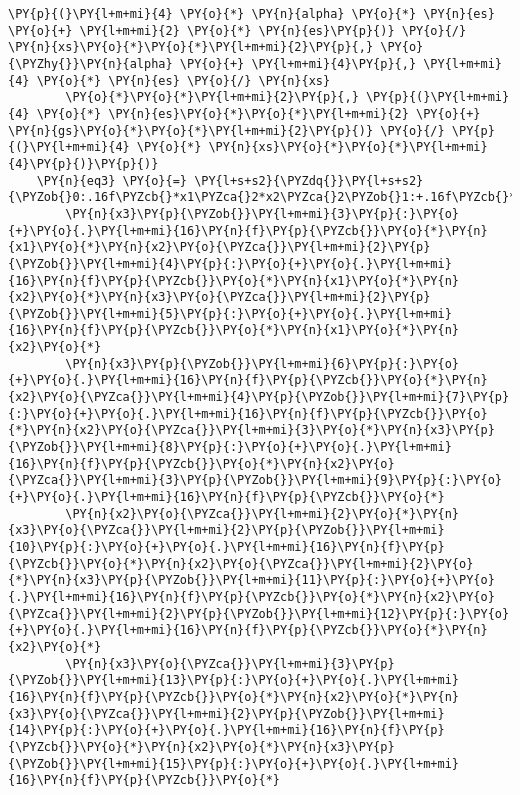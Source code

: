 \begin{Verbatim}[commandchars=\\\{\}]
        \PY{p}{(}\PY{l+m+mi}{4} \PY{o}{*} \PY{n}{alpha} \PY{o}{*} \PY{n}{es} \PY{o}{+} \PY{l+m+mi}{2} \PY{o}{*} \PY{n}{es}\PY{p}{)} \PY{o}{/} \PY{n}{xs}\PY{o}{*}\PY{o}{*}\PY{l+m+mi}{2}\PY{p}{,} \PY{o}{\PYZhy{}}\PY{n}{alpha} \PY{o}{+} \PY{l+m+mi}{4}\PY{p}{,} \PY{l+m+mi}{4} \PY{o}{*} \PY{n}{es} \PY{o}{/} \PY{n}{xs}
        \PY{o}{*}\PY{o}{*}\PY{l+m+mi}{2}\PY{p}{,} \PY{p}{(}\PY{l+m+mi}{4} \PY{o}{*} \PY{n}{es}\PY{o}{*}\PY{o}{*}\PY{l+m+mi}{2} \PY{o}{+} \PY{n}{gs}\PY{o}{*}\PY{o}{*}\PY{l+m+mi}{2}\PY{p}{)} \PY{o}{/} \PY{p}{(}\PY{l+m+mi}{4} \PY{o}{*} \PY{n}{xs}\PY{o}{*}\PY{o}{*}\PY{l+m+mi}{4}\PY{p}{)}\PY{p}{)}
    \PY{n}{eq3} \PY{o}{=} \PY{l+s+s2}{\PYZdq{}}\PY{l+s+s2}{\PYZob{}0:.16f\PYZcb{}*x1\PYZca{}2*x2\PYZca{}2\PYZob{}1:+.16f\PYZcb{}*x1*x2\PYZca{}3\PYZob{}2:+.16f\PYZcb{}*x1*x2\PYZca{}2*}
        \PY{n}{x3}\PY{p}{\PYZob{}}\PY{l+m+mi}{3}\PY{p}{:}\PY{o}{+}\PY{o}{.}\PY{l+m+mi}{16}\PY{n}{f}\PY{p}{\PYZcb{}}\PY{o}{*}\PY{n}{x1}\PY{o}{*}\PY{n}{x2}\PY{o}{\PYZca{}}\PY{l+m+mi}{2}\PY{p}{\PYZob{}}\PY{l+m+mi}{4}\PY{p}{:}\PY{o}{+}\PY{o}{.}\PY{l+m+mi}{16}\PY{n}{f}\PY{p}{\PYZcb{}}\PY{o}{*}\PY{n}{x1}\PY{o}{*}\PY{n}{x2}\PY{o}{*}\PY{n}{x3}\PY{o}{\PYZca{}}\PY{l+m+mi}{2}\PY{p}{\PYZob{}}\PY{l+m+mi}{5}\PY{p}{:}\PY{o}{+}\PY{o}{.}\PY{l+m+mi}{16}\PY{n}{f}\PY{p}{\PYZcb{}}\PY{o}{*}\PY{n}{x1}\PY{o}{*}\PY{n}{x2}\PY{o}{*}
        \PY{n}{x3}\PY{p}{\PYZob{}}\PY{l+m+mi}{6}\PY{p}{:}\PY{o}{+}\PY{o}{.}\PY{l+m+mi}{16}\PY{n}{f}\PY{p}{\PYZcb{}}\PY{o}{*}\PY{n}{x2}\PY{o}{\PYZca{}}\PY{l+m+mi}{4}\PY{p}{\PYZob{}}\PY{l+m+mi}{7}\PY{p}{:}\PY{o}{+}\PY{o}{.}\PY{l+m+mi}{16}\PY{n}{f}\PY{p}{\PYZcb{}}\PY{o}{*}\PY{n}{x2}\PY{o}{\PYZca{}}\PY{l+m+mi}{3}\PY{o}{*}\PY{n}{x3}\PY{p}{\PYZob{}}\PY{l+m+mi}{8}\PY{p}{:}\PY{o}{+}\PY{o}{.}\PY{l+m+mi}{16}\PY{n}{f}\PY{p}{\PYZcb{}}\PY{o}{*}\PY{n}{x2}\PY{o}{\PYZca{}}\PY{l+m+mi}{3}\PY{p}{\PYZob{}}\PY{l+m+mi}{9}\PY{p}{:}\PY{o}{+}\PY{o}{.}\PY{l+m+mi}{16}\PY{n}{f}\PY{p}{\PYZcb{}}\PY{o}{*}
        \PY{n}{x2}\PY{o}{\PYZca{}}\PY{l+m+mi}{2}\PY{o}{*}\PY{n}{x3}\PY{o}{\PYZca{}}\PY{l+m+mi}{2}\PY{p}{\PYZob{}}\PY{l+m+mi}{10}\PY{p}{:}\PY{o}{+}\PY{o}{.}\PY{l+m+mi}{16}\PY{n}{f}\PY{p}{\PYZcb{}}\PY{o}{*}\PY{n}{x2}\PY{o}{\PYZca{}}\PY{l+m+mi}{2}\PY{o}{*}\PY{n}{x3}\PY{p}{\PYZob{}}\PY{l+m+mi}{11}\PY{p}{:}\PY{o}{+}\PY{o}{.}\PY{l+m+mi}{16}\PY{n}{f}\PY{p}{\PYZcb{}}\PY{o}{*}\PY{n}{x2}\PY{o}{\PYZca{}}\PY{l+m+mi}{2}\PY{p}{\PYZob{}}\PY{l+m+mi}{12}\PY{p}{:}\PY{o}{+}\PY{o}{.}\PY{l+m+mi}{16}\PY{n}{f}\PY{p}{\PYZcb{}}\PY{o}{*}\PY{n}{x2}\PY{o}{*}
        \PY{n}{x3}\PY{o}{\PYZca{}}\PY{l+m+mi}{3}\PY{p}{\PYZob{}}\PY{l+m+mi}{13}\PY{p}{:}\PY{o}{+}\PY{o}{.}\PY{l+m+mi}{16}\PY{n}{f}\PY{p}{\PYZcb{}}\PY{o}{*}\PY{n}{x2}\PY{o}{*}\PY{n}{x3}\PY{o}{\PYZca{}}\PY{l+m+mi}{2}\PY{p}{\PYZob{}}\PY{l+m+mi}{14}\PY{p}{:}\PY{o}{+}\PY{o}{.}\PY{l+m+mi}{16}\PY{n}{f}\PY{p}{\PYZcb{}}\PY{o}{*}\PY{n}{x2}\PY{o}{*}\PY{n}{x3}\PY{p}{\PYZob{}}\PY{l+m+mi}{15}\PY{p}{:}\PY{o}{+}\PY{o}{.}\PY{l+m+mi}{16}\PY{n}{f}\PY{p}{\PYZcb{}}\PY{o}{*}

\end{Verbatim}
